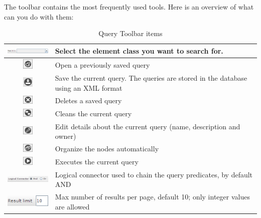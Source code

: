 \documentclass[a4paper]{article}
\begin{document}
	The toolbar contains the most frequently used tools. Here is an overview of what can you do with them:
	\begin{table}[h!]
		\centering
		\begin{tabular}{cl}
			\includegraphics[width=3cm]{img/icon_select_class_query.png} & Select the element class you want to search for. \\
			\midrule
			\includegraphics[width=0.5cm]{img/icon_open.png} & Open a previously saved query\\
			\midrule
			\includegraphics[width=0.5cm]{img/icon_save_view.png} & Save the current query. The queries are stored in the database using an XML format\\
			\midrule
			\includegraphics[width=0.5cm]{img/icon_delete_saved_view.png} & Deletes a saved query\\
			\midrule
			\includegraphics[width=0.5cm]{img/icon_clean_query.png} & Cleans the current query\\
			\midrule
			\includegraphics[width=0.5cm]{img/icon_edit_saved_query.png} & Edit details about the current query (name, description and owner)\\
			\midrule
			\includegraphics[width=0.5cm]{img/icon_reorganize_nodes.png} & Organize the nodes automatically\\
			\midrule
			\includegraphics[width=0.5cm]{img/icon_execute_query.png} & Executes the current query\\
			\midrule
			\includegraphics[width=2.2cm]{img/icon_logical_connector_query.png} & Logical connector used to chain the query predicates, by default AND\\
			\midrule
			\includegraphics[width=2.2cm]{img/icon_result_limit_query.png} & Max number of results per page, default 10; only integer values are allowed\\
		\end{tabular}	
		\caption{Query Toolbar items}
		\label{tab:query_toolbar_icons}
	\end{table}
	
\end{document}
